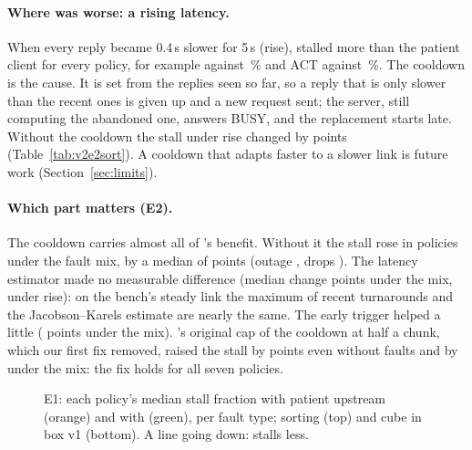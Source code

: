 \paragraph{Where \drtc{} was worse: a rising latency.} When every reply became 0.4\,s slower for 5\,s (rise),
\drtc{} stalled more than the patient client for every policy, for example \smolvla{}  against
\,\% and ACT  against \,\%. The cooldown is the cause. It
is set from the replies seen so far, so a reply that is only slower than the recent ones is given up and a new request
sent; the server, still computing the abandoned one, answers BUSY, and the replacement starts late. Without the
cooldown the stall under rise changed by  points (Table~\ref{tab:v2e2sort}). A cooldown
that adapts faster to a slower link is future work (Section~\ref{sec:limits}).

\paragraph{Which part matters (E2).} The cooldown carries almost all of \drtc's benefit. Without it the stall rose in
 policies under the fault mix, by a median of  points (outage
, drops ). The latency estimator made no measurable
difference (median change  points under the mix, 
under rise): on the bench's steady link the maximum of recent turnarounds and the Jacobson--Karels estimate are nearly
the same. The early trigger helped a little ( points under the mix). \drtc's original
cap of the cooldown at half a chunk, which our first fix removed, raised the stall by 
points even without faults and by  under the mix: the fix holds for all seven policies.

\begin{figure}[htbp]
  \centering
  \par\medskip
  \caption{E1: each policy's median stall fraction with patient upstream (orange) and with \drtc{} (green), per
           fault type; sorting (top) and cube in box v1 (bottom). A line going down: \drtc{} stalls less.}
  \label{fig:v2e1}
\end{figure}

